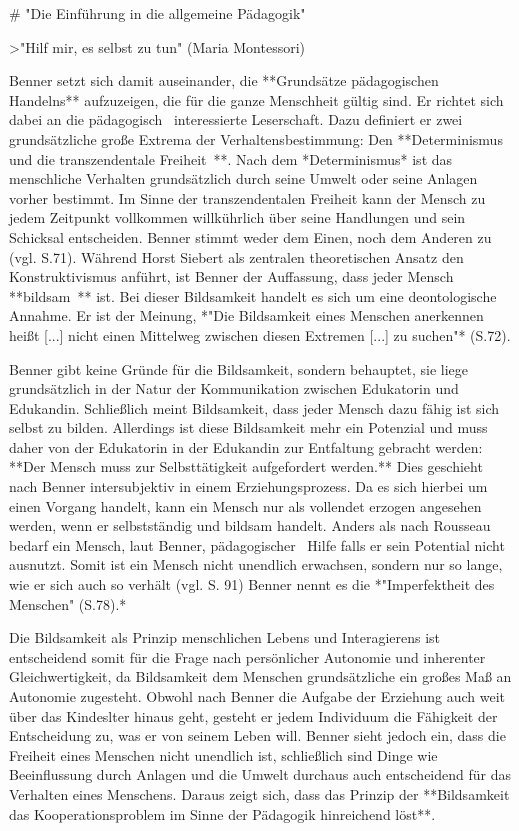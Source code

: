 # "Die Einführung in die allgemeine Pädagogik"

>"Hilf mir, es selbst zu tun" (Maria Montessori)

Benner setzt sich damit auseinander, die **Grundsätze pädagogischen Handelns** aufzuzeigen, die für die ganze Menschheit gültig sind.
Er richtet sich dabei an die pädagogisch~ interessierte Leserschaft.
Dazu definiert er zwei grundsätzliche große Extrema der Verhaltensbestimmung: Den **Determinismus und die transzendentale Freiheit~**.
Nach dem *Determinismus* ist das menschliche Verhalten grundsätzlich durch seine Umwelt oder seine Anlagen vorher bestimmt.
Im Sinne der transzendentalen Freiheit kann der Mensch zu jedem Zeitpunkt vollkommen willkührlich über seine Handlungen und sein Schicksal entscheiden.
Benner stimmt weder dem Einen, noch dem Anderen zu (vgl. S.71).
Während Horst Siebert als zentralen theoretischen Ansatz den Konstruktivismus anführt, ist Benner der Auffassung, dass jeder Mensch **bildsam~** ist.
Bei dieser Bildsamkeit handelt es sich um eine deontologische Annahme.
Er ist der Meinung, *"Die Bildsamkeit eines Menschen anerkennen  heißt [...] nicht einen Mittelweg zwischen diesen Extremen [...] zu suchen"* (S.72).

Benner gibt keine Gründe für die Bildsamkeit, sondern behauptet, sie liege grundsätzlich in der  Natur der Kommunikation zwischen Edukatorin und Edukandin.
Schließlich meint Bildsamkeit, dass jeder Mensch dazu fähig ist sich selbst zu bilden.
Allerdings ist diese Bildsamkeit mehr ein Potenzial und muss daher von der Edukatorin in der Edukandin zur Entfaltung gebracht werden: **Der Mensch muss zur Selbsttätigkeit aufgefordert werden.**
Dies geschieht nach Benner intersubjektiv in einem Erziehungsprozess.
Da es sich hierbei um einen Vorgang handelt, kann ein Mensch nur als vollendet erzogen angesehen werden, wenn er selbstständig und bildsam handelt.
Anders als nach Rousseau bedarf ein Mensch, laut Benner, pädagogischer~ Hilfe falls er sein Potential nicht ausnutzt.
Somit ist ein Mensch nicht unendlich erwachsen, sondern nur so lange, wie er sich auch so verhält (vgl. S. 91)
Benner nennt es die *"Imperfektheit des Menschen" (S.78).*

Die Bildsamkeit als Prinzip menschlichen Lebens und Interagierens ist entscheidend somit für die Frage nach persönlicher Autonomie und inherenter Gleichwertigkeit, da Bildsamkeit dem Menschen grundsätzliche ein großes Maß an Autonomie zugesteht.
Obwohl nach Benner die Aufgabe der Erziehung auch weit über das Kindeslter hinaus geht, gesteht er jedem Individuum die Fähigkeit der Entscheidung zu, was er von seinem Leben will.
Benner sieht jedoch ein, dass die Freiheit eines Menschen nicht unendlich ist, schließlich sind Dinge wie Beeinflussung durch Anlagen und die Umwelt durchaus auch entscheidend für das Verhalten eines Menschens.
Daraus zeigt sich, dass das Prinzip der **Bildsamkeit das Kooperationsproblem im Sinne der Pädagogik hinreichend löst**.

